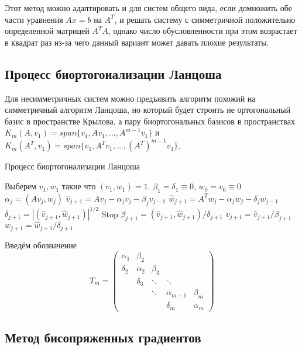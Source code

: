 Этот метод можно адаптировать и для систем общего вида, если домножить обе части уравнения
$Ax=b$ на $A^T$, и решать систему с симметричной положительно определенной матрицей $A^TA$,
однако число обусловленности при этом возрастает в квадрат раз из-за чего данный вариант может 
давать плохие результаты.
\cite{Saad2003} 
\subsection{Процесс биортогонализации Ланцоша}
Для несимметричных систем можно предъявить алгоритм похожий на симметричный алгоритм Ланцоша,
но который будет строить не ортогональный базис в пространстве Крылова, а пару биортогональных
базисов в пространствах $K_m(A, v_1) = span\{v_1,Av_1,...,A^{m-1}v_1\}$ и $K_m(A^T, v_1) = span\{v_1,A^Tv_1,...,(A^T)^{m-1}v_1\}$.
\begin{algorithm}
    \caption{Процесс биортогонализации Ланцоша}
    \begin{algorithmic}[1]
    \State Выберем $v_{1}, w_{1}$ такие что $(v_{1}, w_{1}) = 1$.
    \State $\beta_{1} = \delta_{1} \equiv 0$, $w_{0} = v_{0} \equiv 0$
        \State $\alpha_{j} = (A v_{j}, w_{j})$
        \State $\hat{v}_{j+1} = A v_{j} - \alpha_{j} v_{j} - \beta_{j} v_{j-1}$
        \State $\hat{w}_{j+1} = A^{T} w_{j} - \alpha_{j} w_{j} - \delta_{j} w_{j-1}$
        \State $\delta_{j+1} = |(\hat{v}_{j+1}, \hat{w}_{j+1})|^{1/2}$
            \State Stop
        \EndIf
        \State $\beta_{j+1} = (\hat{v}_{j+1}, \hat{w}_{j+1}) / \delta_{j+1}$
        \State $v_{j+1} = \hat{v}_{j+1} / \beta_{j+1}$
        \State $w_{j+1} = \hat{w}_{j+1} / \delta_{j+1}$
    \EndFor
    \end{algorithmic}
    \end{algorithm}

Введём обозначение 
\begin{equation}
    T_m = 
    \begin{pmatrix}
        \alpha_1 & \beta_2 & & & \\
        \delta_2 & \alpha_2 & \beta_3 & & \\
        & \delta_3 & \ddots & \ddots & \\
        & & \ddots & \alpha_{m-1} & \beta_m \\
        & & & \delta_m & \alpha_m
    \end{pmatrix}
\end{equation}

\subsection{Метод бисопряженных градиентов}

